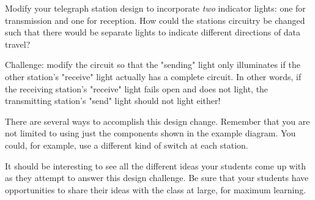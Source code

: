 

Modify your telegraph station design to incorporate {\it two} indicator lights: one for transmission and one for reception.  How could the stations circuitry be changed such that there would be separate lights to indicate different directions of data travel?

\vskip 10pt

Challenge: modify the circuit so that the "sending" light only illuminates if the other station's "receive" light actually has a complete circuit.  In other words, if the receiving station's "receive" light fails open and does not light, the transmitting station's "send" light should not light either!







There are several ways to accomplish this design change.  Remember that you are not limited to using just the components shown in the example diagram.  You could, for example, use a different kind of switch at each station.







It should be interesting to see all the different ideas your students come up with as they attempt to answer this design challenge.  Be sure that your students have opportunities to share their ideas with the class at large, for maximum learning.



